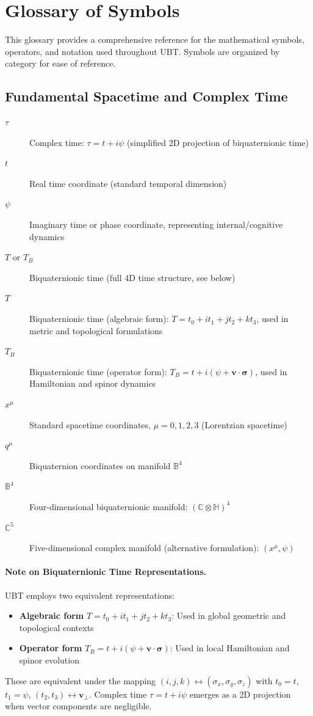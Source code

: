 \section{Glossary of Symbols}
\label{app:glossary}

This glossary provides a comprehensive reference for the mathematical symbols, operators, and notation used throughout UBT. Symbols are organized by category for ease of reference.

\subsection{Fundamental Spacetime and Complex Time}

\begin{description}
\item[$\tau$] Complex time: $\tau = t + i\psi$ (simplified 2D projection of biquaternionic time)
\item[$t$] Real time coordinate (standard temporal dimension)
\item[$\psi$] Imaginary time or phase coordinate, representing internal/cognitive dynamics
\item[$T$ or $T_B$] Biquaternionic time (full 4D time structure, see below)
\item[$T$] Biquaternionic time (algebraic form): $T = t_0 + i t_1 + j t_2 + k t_3$, used in metric and topological formulations
\item[$T_B$] Biquaternionic time (operator form): $T_B = t + i(\psi + \mathbf{v} \cdot \boldsymbol{\sigma})$, used in Hamiltonian and spinor dynamics
\item[$x^\mu$] Standard spacetime coordinates, $\mu = 0,1,2,3$ (Lorentzian spacetime)
\item[$q^\mu$] Biquaternion coordinates on manifold $\mathbb{B}^4$
\item[$\mathbb{B}^4$] Four-dimensional biquaternionic manifold: $(\mathbb{C} \otimes \mathbb{H})^4$
\item[$\mathbb{C}^5$] Five-dimensional complex manifold (alternative formulation): $(x^\mu, \psi)$
\end{description}

\paragraph{Note on Biquaternionic Time Representations.} UBT employs two equivalent representations:
\begin{itemize}
\item \textbf{Algebraic form} $T = t_0 + i t_1 + j t_2 + k t_3$: Used in global geometric and topological contexts
\item \textbf{Operator form} $T_B = t + i(\psi + \mathbf{v} \cdot \boldsymbol{\sigma})$: Used in local Hamiltonian and spinor evolution
\end{itemize}
These are equivalent under the mapping $(i,j,k) \leftrightarrow (\sigma_x, \sigma_y, \sigma_z)$ with $t_0=t$, $t_1=\psi$, $(t_2,t_3) \leftrightarrow \mathbf{v}_\perp$. Complex time $\tau = t + i\psi$ emerges as a 2D projection when vector components are negligible.

